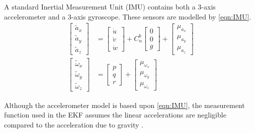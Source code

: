 A standard Inertial Measurement Unit (IMU) contains both a 3-axis accelerometer and a 3-axis gyroscope. These sensors are modelled by \eqref{eqn:IMU}.
\begin{equation}\label{eqn:IMU}
\begin{split}
\begin{bmatrix}
\tilde{a}_{x}\\
\tilde{a}_{y}\\
\tilde{a}_{z}
\end{bmatrix}
&=
\begin{bmatrix}
\dot{u}\\
\dot{v}\\
\dot{w}
\end{bmatrix}
+
C^{b}_{n}
\begin{bmatrix}
0\\
0\\
g
\end{bmatrix}
+
\begin{bmatrix}
\mu_{a_{x}}\\
\mu_{a_{y}}\\
\mu_{a_{z}}
\end{bmatrix}\\
\begin{bmatrix}
\tilde{\omega}_{x}\\
\tilde{\omega}_{y}\\
\tilde{\omega}_{z}
\end{bmatrix}
&=
\begin{bmatrix}
p\\
q\\
r
\end{bmatrix}
+
\begin{bmatrix}
\mu_{\omega_{x}}\\
\mu_{\omega_{y}}\\
\mu_{\omega_{z}}
\end{bmatrix}
\end{split}
\end{equation}

Although the accelerometer model is based upon \eqref{eqn:IMU}, the measurement function used in the EKF assumes the linear accelerations are negligible compared to the acceleration due to gravity \cite{Strohmeier2017}.  

